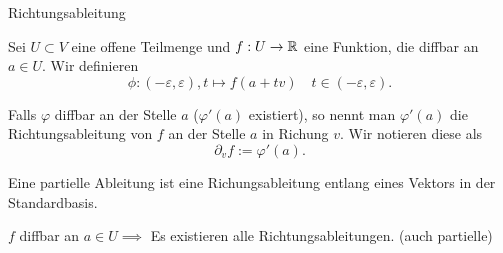 \documentclass[class=article, crop=false]{standalone}
\begin{document}
\begin{zettel}{Richtungsableitung}
\begin{flashcard}[]{}
	\begin{definition}
		Sei $U \subset V$ eine offene Teilmenge und $f: U \to \mathbb{R} $ eine Funktion, die diffbar an $a \in   U$. Wir definieren
		\[
			\phi : (-\varepsilon,\varepsilon), t \mapsto f (a+ tv) \quad t \in  (-\varepsilon,\varepsilon)
		.\]

		Falls $\varphi$ diffbar an der Stelle $a$ ($\varphi'(a)$ existiert), so nennt man $\varphi '(a)$ die Richtungsableitung von $f$ an der Stelle $a$ in Richung $v$. Wir notieren diese als
		\[
			\partial_v f := \varphi ' (a)
		.\]
	\end{definition}
\end{flashcard}

\begin{remark}
	Eine partielle Ableitung ist eine Richungsableitung entlang eines Vektors in der Standardbasis.
\end{remark}

\begin{theorem}
	$f$ diffbar an $a \in  U \implies $ Es existieren alle Richtungsableitungen. (auch partielle)
\end{theorem}

\end{zettel}
\end{document}
